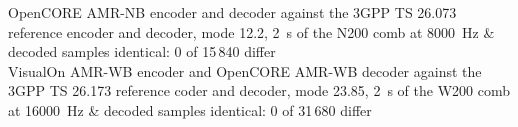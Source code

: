 OpenCORE AMR-NB encoder and decoder against the 3GPP TS 26.073 reference encoder and decoder, mode 12.2, 2~s of the N200 comb at 8000~Hz & decoded samples identical: 0 of 15\,840 differ \\
VisualOn AMR-WB encoder and OpenCORE AMR-WB decoder against the 3GPP TS 26.173 reference coder and decoder, mode 23.85, 2~s of the W200 comb at 16000~Hz & decoded samples identical: 0 of 31\,680 differ \\
